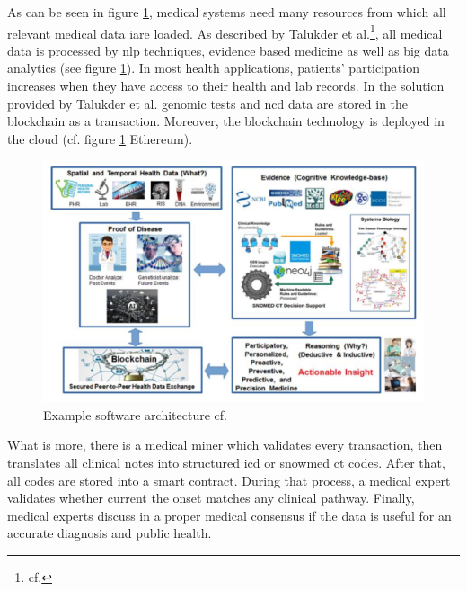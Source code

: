 As can be seen in figure \ref{example_software_architecture}, medical systems need many resources from which all relevant medical data iare loaded. As described by Talukder et al.\footnote{cf.\autocite{talukder}}, all medical data is processed by \ac{nlp} techniques, evidence based medicine as well as big data analytics (see figure \ref{example_software_architecture}).
In most health applications, patients' participation increases when they have access to their health and lab records. In the solution provided by Talukder et al. genomic tests and \ac{ncd} data are stored in the blockchain as a transaction.
Moreover, the blockchain technology is deployed in the cloud (cf. figure \ref{example_software_architecture} Ethereum).

\begin{figure}[htbp]
	\centering
	\includegraphics[width=1\textwidth]{images/example_software_architecture.png}
	\caption{Example software architecture cf.\autocite{talukder}}
	\label{example_software_architecture}
\end{figure}

What is more, there is a medical miner which validates every transaction, then translates all clinical notes into structured \ac{icd} or \ac{snowmed ct} codes. After that, all codes are stored into a smart contract. During that process, a medical expert validates whether current the onset matches any clinical pathway. 
Finally, medical experts discuss in a proper medical consensus if the data is useful for an accurate diagnosis and public health.

